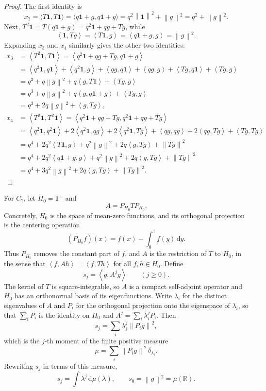 \documentclass[11pt]{article}
\numberwithin{equation}{section}
\newcommand{\one}{\mathbf 1}
\newcommand{\R}{\mathbb R}
\newcommand{\ip}[2]{\left\langle #1,#2\right\rangle}
\newcommand{\norm}[1]{\left\lVert #1\right\rVert}
\newcommand{\dd}{\,\mathrm d}
\begin{document}
\begin{proof}
  The first identity is
  \[
    x_2 = \langle T\one, T\one\rangle = \langle q\one + g, q\one + g\rangle = q^2 \norm{\one}^2 + \norm{g}^2 = q^2 + \norm{g}^2.
  \]
  Next, $T^2\one=T(q \one + g) = q^2\one + qg + Tg$, while
  \[
    \ip{\one}{Tg}=\ip{T\one}{g}= \ip{q\one + g}{g}=\norm g^2.
  \]
  Expanding $x_3$ and $x_4$ similarly gives the other two identities:
  \begin{align*}
    x_3 &= \ip{T^2\one}{T\one} = \ip{q^2\one + qg + Tg}{q\one + g} \\
    {} &= \ip{q^2\one}{q\one} + \ip{q^2\one}{g} + \ip{qg}{q\one} + \ip{qg}{g} + \ip{Tg}{q\one} + \ip{Tg}{g} \\
    {} &= q^3 + q \norm{g}^2 + q \ip{g}{T \one} + \ip{Tg}{g} \\
    {} &= q^3 + q \norm{g}^2 + q \ip{g}{q \one + g} + \ip{Tg}{g} \\
    {} &= q^3 + 2q \norm{g}^2 + \ip{g}{Tg},
    \\
    x_4 &= \ip{T^2 \one}{T^2 \one} = \ip{q^2\one + qg + Tg}{q^2\one + qg + Tg} \\
    {} &= \ip{q^2\one}{q^2\one} + 2 \ip{q^2\one}{qg} + 2 \ip{q^2\one}{Tg} + \ip{qg}{qg} + 2 \ip{qg}{Tg} + \ip{Tg}{Tg} \\
    {} &= q^4 + 2q^2 \ip{T \one}{g} + q^2 \norm{g}^2 + 2q \ip{g}{Tg} + \norm{Tg}^2 \\
    {} &= q^4 + 2q^2 \ip{q \one + g}{g} + q^2 \norm{g}^2 + 2q \ip{g}{Tg} + \norm{Tg}^2 \\
    {} &= q^4 + 3q^2 \norm{g}^2 + 2q \ip{g}{Tg} + \norm{Tg}^2.
  \end{align*}
\end{proof}

For $C_7$, let $H_0=\one^\perp$ and
\[
  A=P_{H_0}TP_{H_0}.
\]
Concretely, $H_0$ is the space of mean-zero functions, and its orthogonal projection is the centering operation
\[
  (P_{H_0}f)(x)=f(x)-\int_0^1f(y)\dd y.
\]
Thus $P_{H_0}$ removes the constant part of $f$, and $A$ is the restriction of $T$ to $H_0$, in the sense that $\ip f{Ah}=\ip f{Th}$ for all $f,h\in H_0$.
Define
\begin{equation}\label{eq:sj-def}
  s_j=\ip g{A^jg}\qquad(j\ge0).
\end{equation}
The kernel of $T$ is square-integrable, so $A$ is a compact self-adjoint operator and $H_0$ has an orthonormal basis of its eigenfunctions.
Write $\lambda_i$ for the distinct eigenvalues of $A$ and $P_i$ for the orthogonal projection onto the eigenspace of $\lambda_i$, so that $\sum_iP_i$ is the identity on $H_0$ and $A^j=\sum_i\lambda_i^jP_i$.
Then
\[
  s_j=\sum_i\lambda_i^j\norm{P_ig}^2,
\]
which is the $j$-th moment of the finite positive measure
\begin{equation}\label{eq:mu-short}
  \mu=\sum_i\norm{P_ig}^2\,\delta_{\lambda_i}.
\end{equation}
Rewriting $s_j$ in terms of this measure,
\begin{equation}\label{eq:sj-moment}
  s_j=\int\lambda^j\dd\mu(\lambda),
  \qquad s_0=\norm g^2=\mu(\R).
\end{equation}
\end{document}
